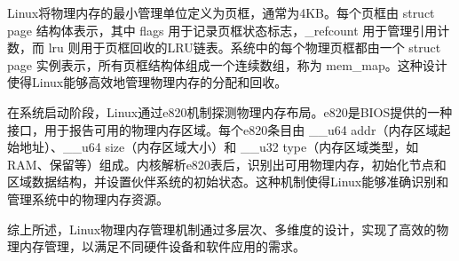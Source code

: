 Linux将物理内存的最小管理单位定义为页框，通常为4KB。每个页框由 struct page 结构体表示，其中 flags 用于记录页框状态标志，\_refcount 用于管理引用计数，而 lru 则用于页框回收的LRU链表。系统中的每个物理页框都由一个 struct page 实例表示，所有页框结构体组成一个连续数组，称为 mem\_map。这种设计使得Linux能够高效地管理物理内存的分配和回收。

在系统启动阶段，Linux通过e820机制探测物理内存布局。e820是BIOS提供的一种接口，用于报告可用的物理内存区域。每个e820条目由 \_\_u64 addr（内存区域起始地址）、\_\_u64 size（内存区域大小）和 \_\_u32 type（内存区域类型，如RAM、保留等）组成。内核解析e820表后，识别出可用物理内存，初始化节点和区域数据结构，并设置伙伴系统的初始状态。这种机制使得Linux能够准确识别和管理系统中的物理内存资源。

综上所述，Linux物理内存管理机制通过多层次、多维度的设计，实现了高效的物理内存管理，以满足不同硬件设备和软件应用的需求。







